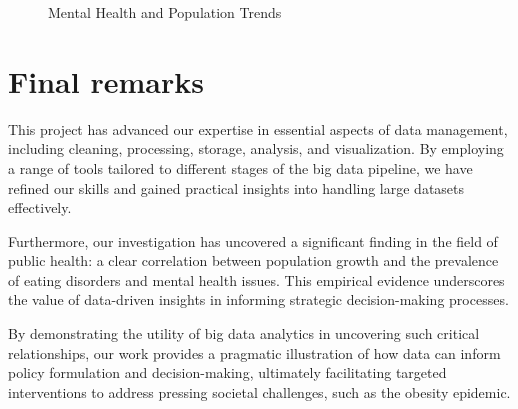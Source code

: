 \documentclass[runningheads]{llncs}
\begin{document}
\begin{figure}[ht!]
\caption{Mental Health and Population Trends}  %
\label{fig:all}
\end{figure}

\clearpage
\section{Final remarks}
This project has advanced our expertise in essential aspects of data management, including cleaning, processing, storage, analysis, and visualization. By employing a range of tools tailored to different stages of the big data pipeline, we have refined our skills and gained practical insights into handling large datasets effectively.

Furthermore, our investigation has uncovered a significant finding in the field of public health: a clear correlation between population growth and the prevalence of eating disorders and mental health issues. This empirical evidence underscores the value of data-driven insights in informing strategic decision-making processes.

By demonstrating the utility of big data analytics in uncovering such critical relationships, our work provides a pragmatic illustration of how data can inform policy formulation and decision-making, ultimately facilitating targeted interventions to address pressing societal challenges, such as the obesity epidemic.

%
%
%
%




%
\end{document}
